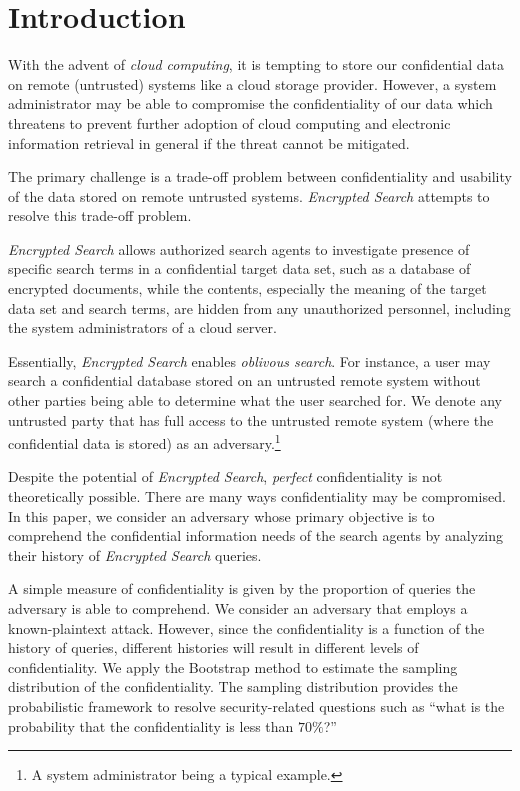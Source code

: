 \documentclass[ ../main.tex]{subfiles}
\begin{document}
\section{Introduction}
\label{sec:introduction}
With the advent of \emph{cloud computing}, it is tempting to store our confidential data on remote (untrusted) systems like a cloud storage provider. However, a system administrator may be able to compromise the confidentiality of our data which threatens to prevent further adoption of cloud computing and electronic information retrieval in general if the threat cannot be mitigated\cite{ref1,ref2,ref3}.

The primary challenge is a trade-off problem between confidentiality and usability of the data stored on remote untrusted systems. \emph{Encrypted Search} attempts to resolve this trade-off problem.
\begin{definition}
\emph{Encrypted Search} allows authorized search agents to investigate presence of specific search terms in a confidential target data set, such as a database of encrypted documents\cite{ref4,ref5,ref6,ref7,ref8}, while the contents, especially the meaning of the target data set and search terms, are hidden from any unauthorized personnel, including the system administrators of a cloud server.
\end{definition}
Essentially, \emph{Encrypted Search} enables \emph{oblivous search}. For instance, a user may search a confidential database stored on an untrusted remote system without other parties being able to determine what the user searched for. We denote any untrusted party that has full access to the untrusted remote system (where the confidential data is stored) as an adversary.\footnote{A system administrator being a typical example.}

Despite the potential of \emph{Encrypted Search}, \emph{perfect} confidentiality is not theoretically possible. There are many ways confidentiality may be compromised. In this paper, we consider an adversary whose primary objective is to comprehend the confidential information needs of the search agents by analyzing their history of \emph{Encrypted Search} queries.

A simple measure of confidentiality is given by the proportion of queries the adversary is able to comprehend. We consider an adversary that employs a known-plaintext attack. However, since the confidentiality is a function of the history of queries, different histories will result in different levels of confidentiality. We apply the Bootstrap method to estimate the sampling distribution of the confidentiality. The sampling distribution provides the probabilistic framework to resolve security-related questions such as ``what is the probability that the confidentiality is less than $70\%$?'' 
\end{document}
